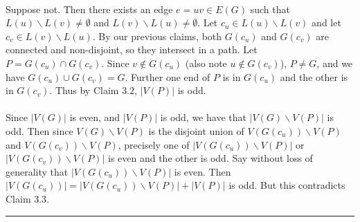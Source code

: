 \documentclass[letterpaper,12pt,oneside,onecolumn]{article}
\newenvironment{proof}{{\bf Proof:  }}{\hfill\rule{2mm}{2mm}}
\begin{document}
\begin{proof}
	\paragraph{}
	Suppose not. Then there exists an edge $e=uv \in E(G)$ such that $L(u)\backslash L(v) \neq \emptyset$ and $L(v)\backslash L(u) \neq \emptyset$. Let $c_u \in L(u) \backslash L(v)$ and let $c_v \in L(v)\backslash L(u)$. By our previous claims, both $G(c_u)$ and $G(c_v)$ are connected and non-disjoint, so they intersect in a path. Let $P = G(c_u) \cap G(c_v)$. Since $v \not\in G(c_u)$ (also note $u \not\in G(c_v)$), $P \neq G$, and we have $G(c_u) \cup G(c_v) = G$. Further one end of $P$ is in $G(c_u)$ and the other is in $G(c_v)$. Thus by Claim $3.2$, $|V(P)|$ is odd.
	\paragraph{}
	Since $|V(G)|$ is even,  and $|V(P)|$ is odd, we have that $|V(G) \backslash V(P)|$ is odd. Then since $V(G)\backslash V(P)$ is the disjoint union of $V(G(c_u))\backslash V(P)$ and $V(G(c_v)) \backslash V(P)$, precisely one of $|V(G(c_u))\backslash V(P)|$ or $|V(G(c_v))\backslash V(P)|$ is even and the other is odd. Say without loss of generality that $|V(G(c_u))\backslash V(P)|$ is even. Then $|V(G(c_u))| = |V(G(c_u))\backslash V(P)| + |V(P)|$ is odd. But this contradicts Claim $3.3$.
	\end{proof}
\end{document}
